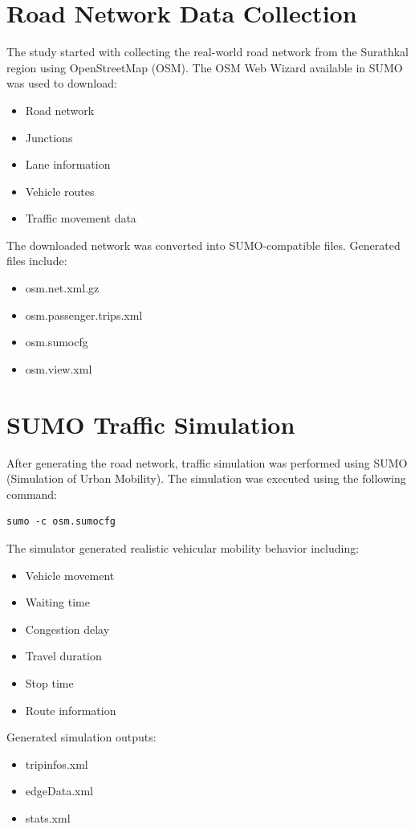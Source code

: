 \documentclass[12pt,a4paper]{report}
\begin{document}
\section{Road Network Data Collection}
The study started with collecting the real-world road network from the Surathkal region using OpenStreetMap (OSM).
The OSM Web Wizard available in SUMO was used to download:
\begin{itemize}
    \item Road network
    \item Junctions
    \item Lane information
    \item Vehicle routes
    \item Traffic movement data
\end{itemize}
The downloaded network was converted into SUMO-compatible files.
Generated files include:
\begin{itemize}
    \item osm.net.xml.gz
    \item osm.passenger.trips.xml
    \item osm.sumocfg
    \item osm.view.xml
\end{itemize}

\section{SUMO Traffic Simulation}
After generating the road network, traffic simulation was performed using SUMO (Simulation of Urban Mobility).
The simulation was executed using the following command:
\begin{verbatim}
sumo -c osm.sumocfg
\end{verbatim}
The simulator generated realistic vehicular mobility behavior including:
\begin{itemize}
    \item Vehicle movement
    \item Waiting time
    \item Congestion delay
    \item Travel duration
    \item Stop time
    \item Route information
\end{itemize}
Generated simulation outputs:
\begin{itemize}
    \item tripinfos.xml
    \item edgeData.xml
    \item stats.xml
\end{itemize}
\end{document}
